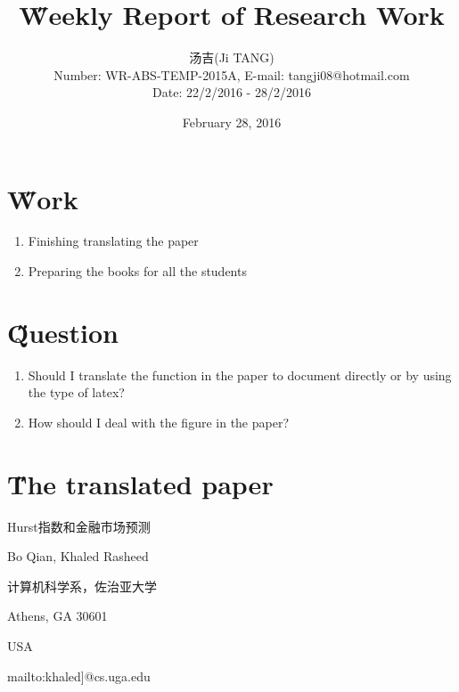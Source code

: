 \documentclass[12pt]{article}
\title{{\H Weekly Report of Research Work\\ }\quad {WR-ABS-TEMP-2015A-No.014}}
\author{汤吉(Ji TANG)\\
               Number: WR-ABS-TEMP-2015A,  E-mail: tangji08@hotmail.com \\
        Date: 22/2/2016 - 28/2/2016}
\date{February 28, 2016}
\begin{document}
  
\maketitle
\pagestyle{fancy}
\fancyhead[LO,RE]{\leftmark} %



\renewcommand{\headrulewidth}{0.4pt}
\renewcommand{\footrulewidth}{0.4pt}



\tableofcontents 
\newpage
\section{\H Work}
\begin{enumerate}
	\item Finishing translating the paper
	\item Preparing the books for all the students
\end{enumerate}

\section{\H Question}
\begin{enumerate}
	\item Should I translate the function in the paper to document directly or by using the type of latex?
	\item How should I deal with the figure in the paper?
\end{enumerate}

\section{\H The translated paper}
Hurst指数和金融市场预测

Bo Qian, Khaled Rasheed

计算机科学系，佐治亚大学

Athens, GA 30601

USA

mailto:khaled]@cs.uga.edu
\end{document}
